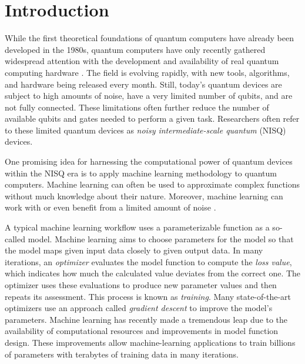 \chapter{Introduction}
\label{chap:intro}


While the first theoretical foundations of quantum computers have already been
developed in the 1980s, quantum computers have only recently gathered widespread
attention with the development and availability of real quantum computing
hardware \cite{nielsen_quantum_2007,hidary_quantum_2021}.
The field is evolving rapidly, with new tools, algorithms, and hardware being
released every month. %
Still, today's quantum devices are subject to high amounts of noise, have a very
limited number of qubits, and are not fully connected.
These limitations often further reduce the number of available qubits and gates
needed to perform a given task.
Researchers often refer to these limited quantum devices as
\emph{noisy intermediate-scale quantum} (NISQ) devices.

One promising idea for harnessing the computational power of quantum devices
within the NISQ era is to apply machine learning methodology to quantum
computers.
Machine learning can often be used to approximate complex functions without much
knowledge about their nature.
Moreover, machine learning can work with or even benefit from a limited amount
of noise \cite{ciliberto_quantum_2018}.

A typical machine learning workflow uses a parameterizable function as a
so-called model.
Machine learning aims to choose parameters for the model so that the model maps
given input data closely to given output data.
In many iterations, an \emph{optimizer} evaluates the model function to compute
the \emph{loss value}, which indicates how much the calculated value deviates
from the correct one.
The optimizer uses these evaluations to produce new parameter values and then
repeats its assessment.
This process is known as \emph{training}.
Many state-of-the-art optimizers use an approach called \emph{gradient descent}
to improve the model's parameters.
Machine learning has recently made a tremendous leap due to the availability of
computational resources and improvements in model function design.
These improvements allow machine-learning applications to train billions of
parameters with terabytes of training data in many iterations.

